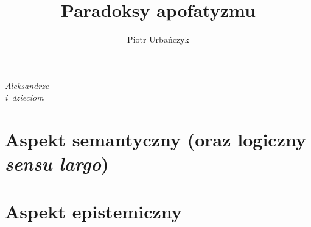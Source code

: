 \documentclass[12pt,a4paper,oneside,leqno,titlepage]{report}
\title{Paradoksy apofatyzmu}
\author{Piotr Urbańczyk}
\theoremstyle{definition}
\begin{document}


\stronatytulowaalt

\thispagestyle{empty}
\vspace*{19cm}
\begin{flushright}
\textit{Aleksandrze\\i~dzieciom}
\end{flushright}
\newpage




\tableofcontents

\cleardoublepage





\part{Aspekt semantyczny (oraz logiczny \textit{sensu largo})}




\part{Aspekt epistemiczny}
\end{document}
